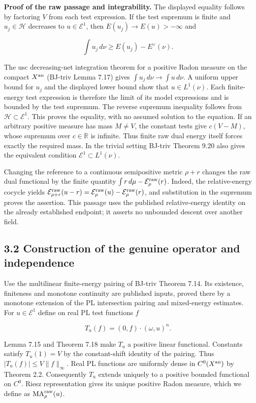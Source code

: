 \documentclass[
  11pt,
]{article}
\begin{document}
\textbf{Proof of the raw passage and integrability.} The displayed
equality follows by factoring \(V\) from each test expression. If the
test supremum is finite and \(u_j\in\mathcal H\) decreases to
\(u\in\mathcal E^1\), then \(E(u_j)\to E(u)>-\infty\) and

\[\int u_j\,d\nu\geq E(u_j)-E^\vee(\nu).\]

The usc decreasing-net integration theorem for a positive Radon measure
on the compact \(X^{\rm an}\) (BJ-triv Lemma 7.17) gives
\(\int u_j\,d\nu\to\int u\,d\nu\). A uniform upper bound for \(u_j\) and
the displayed lower bound show that \(u\in L^1(\nu)\). Each
finite-energy test expression is therefore the limit of its model
expressions and is bounded by the test supremum. The reverse supremum
inequality follows from \(\mathcal H\subset\mathcal E^1\). This proves
the equality, with no assumed solution to the equation. If an arbitrary
positive measure has mass \(M\ne V\), the constant tests give
\(c(V-M)\), whose supremum over \(c\in\mathbb R\) is infinite. Thus
finite raw dual energy itself forces exactly the required mass. In the
trivial setting BJ-triv Theorem 9.20 also gives the equivalent condition
\(\mathcal E^1\subset L^1(\nu)\).

Changing the reference to a continuous semipositive metric \(\rho+r\)
changes the raw dual functional by the finite quantity
\(\int r\,d\mu-\mathcal E_{\rho}^{\rm raw}(r)\). Indeed, the
relative-energy cocycle yields
\(\mathcal E_{\rho+r}^{\rm raw}(u-r)=\mathcal E_{\rho}^{\rm raw}(u)-\mathcal E_{\rho}^{\rm raw}(r)\),
and substitution in the supremum proves the assertion. This passage uses
the published relative-energy identity on the already established
endpoint; it asserts no unbounded descent over another field.

\subsection{3.2 Construction of the genuine operator and
independence}\label{construction-of-the-genuine-operator-and-independence}

Use the multilinear finite-energy pairing of BJ-triv Theorem 7.14. Its
existence, finiteness and monotone continuity are published inputs,
proved there by a monotone extension of the PL intersection pairing and
mixed-energy estimates. For \(u\in\mathcal E^1\) define on real PL test
functions \(f\)

\[T_u(f)=(0,f)\cdot(\omega,u)^n.\]

Lemma 7.15 and Theorem 7.18 make \(T_u\) a positive linear functional.
Constants satisfy \(T_u(1)=V\) by the constant-shift identity of the
pairing. Thus \(|T_u(f)|\leq V\|f\|_\infty\). Real PL functions are
uniformly dense in \(C^0(X^{\rm an})\) by Theorem 2.2. Consequently
\(T_u\) extends uniquely to a positive bounded functional on \(C^0\).
Riesz representation gives its unique positive Radon measure, which we
define as \(\operatorname{MA}_{\rho}^{\rm raw}(u)\).
\end{document}
